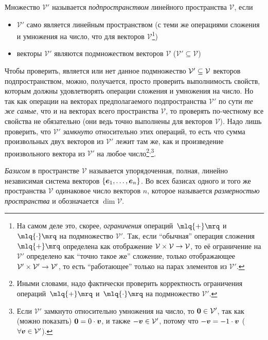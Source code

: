 \documentclass[a4paper,12pt]{article}
\begin{document}
  Множество $\mathcal V'$ называется \emph{подпространством} линейного пространства $\mathcal V$, если
  \begin{itemize}
    \item $\mathcal V'$ само является линейным пространством (с теми же операциями сложения и умножения на число, что для векторов $\mathcal V$\footnote{На самом деле это, скорее, \emph{ограничения} операций~$\mlq{+}\mrq$ и~$\mlq{\cdot}\mrq$ на подмножество $\mathcal V'$. Так, если ``обычная'' операция сложения $\mlq{+}\mrq$ определена как отображение $\mathcal V \hm\times \mathcal V \hm\to \mathcal V$, то её ограничение на $\mathcal V'$ определено как ``точно такое же'' сложение, только отображающее $\mathcal V' \hm\times \mathcal V' \hm\to \mathcal V'$, то есть ``работающее'' только на парах элементов из $\mathcal V'$.})
    \item векторы $\mathcal V'$ являются подмножеством векторов $\mathcal V$ ($\mathcal V' \subseteq \mathcal V$)
  \end{itemize}
  
  Чтобы проверить, является или нет данное подмножество $\mathcal V' \hm\subseteq \mathcal V$ векторов подпространством, можно, получается, просто проверить выполнимость свойств, которым должны удовлетворять операции сложения и умножения на число.
  Но так как операции на векторах предполагаемого подпространства $\mathcal V'$ по сути \emph{те же самые}, что и на векторах всего пространства $\mathcal V$, то проверять по-честному все свойства не обязательно (они ведь точно выполнены для векторов $\mathcal V$).
  Надо лишь проверить, что $\mathcal V'$ \emph{замкнуто} относительно этих операций, то есть что сумма произвольных двух векторов из $\mathcal V'$ лежит там же, как и произведение произвольного вектора из $\mathcal V'$ на любое число\footnote{Иными словами, надо фактически проверить корректность ограничения операций~$\mlq{+}\mrq$ и~$\mlq{\cdot}\mrq$ на подмножество $\mathcal V'$.}\textsuperscript{,}\footnote{Если $\mathcal V'$ замкнуто относительно умножения на число, то $\bds 0 \hm\in \mathcal V'$, так как (можно показать) $\bds 0 \hm= 0 \hm\cdot \bds v$, и также $-{\bds v} \hm\in \mathcal V'$, потому что $-{\bds v} \hm= -1 \hm\cdot \bds v$ ($\forall \bds v \hm\in \mathcal V'$).}.
  
  \emph{Базисом} в пространстве $\mathcal V$ называется упорядоченная, полная, линейно независимая система векторов $\{\boldsymbol e_1, \ldots, \boldsymbol e_n\}$.
  Во всех базисах одного и того же пространства $\mathcal V$ одинаковое число векторов $n$, которое называется \emph{размерностью пространства} и обозначается $\dim \mathcal V$.
  
\end{document}
